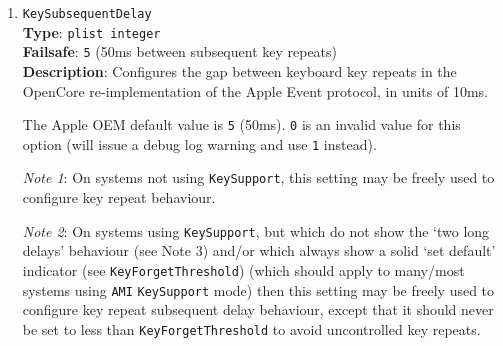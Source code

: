 \documentclass[]{article}
\begin{document}
\begin{enumerate}
\item
  \texttt{KeySubsequentDelay}\\
  \textbf{Type}: \texttt{plist\ integer}\\
  \textbf{Failsafe}: \texttt{5} (50ms between subsequent key repeats)\\
  \textbf{Description}: Configures the gap between keyboard key repeats in the OpenCore re-implementation
  of the Apple Event protocol, in units of 10ms.

  The Apple OEM default value is \texttt{5} (50ms).
  \texttt{0} is an invalid value for this option (will issue a debug log warning and use \texttt{1} instead).

  \emph{Note 1}: On systems not using \texttt{KeySupport}, this setting may be freely used
  to configure key repeat behaviour.

  \emph{Note 2}: On systems using \texttt{KeySupport}, but which do not show the `two long
  delays' behaviour (see Note 3) and/or which always show a solid `set default' indicator
  (see \texttt{KeyForgetThreshold}) (which should apply to many/most systems using \texttt{AMI}
  \texttt{KeySupport} mode) then this setting may be freely used to configure key repeat
  subsequent delay behaviour, except that it should never be set to less than \texttt{KeyForgetThreshold}
  to avoid uncontrolled key repeats.


\end{enumerate}
\end{document}
